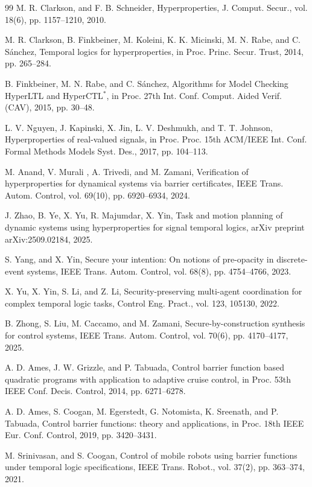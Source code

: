 \documentclass[letterpaper, 10 pt, conference]{ieeeconf}  %
\begin{document}
\begin{thebibliography}{99}
 M. R. Clarkson, and F. B. Schneider, Hyperproperties, J. Comput. Secur., vol. 18(6), pp. 1157--1210, 2010.

 M. R. Clarkson, B. Finkbeiner, M. Koleini, K. K. Micinski, M. N. Rabe, and C. Sánchez, Temporal logics for hyperproperties, in Proc. Princ. Secur. Trust, 2014, pp. 265--284.

 B. Finkbeiner, M. N. Rabe, and C. Sánchez, Algorithms for Model Checking HyperLTL and HyperCTL$^*$, in Proc. 27th Int. Conf. Comput. Aided Verif. (CAV), 2015, pp. 30--48.

 L. V. Nguyen, J. Kapinski, X. Jin, L. V. Deshmukh, and T. T. Johnson, Hyperproperties of real-valued signals, in Proc. Proc. 15th ACM/IEEE Int. Conf. Formal Methods Models Syst. Des., 2017, pp. 104--113.

 M. Anand, V. Murali , A. Trivedi, and M. Zamani, Verification of hyperproperties for dynamical systems via barrier certificates, IEEE Trans. Autom. Control, vol. 69(10), pp. 6920--6934, 2024.

 J. Zhao, B. Ye, X. Yu, R. Majumdar, X. Yin, Task and motion planning of dynamic systems using hyperproperties for signal temporal logics, arXiv preprint arXiv:2509.02184, 2025.

 S. Yang, and X. Yin, Secure your intention: On notions of pre-opacity in discrete-event systems, IEEE Trans. Autom. Control, vol. 68(8), pp. 4754--4766, 2023.

 X. Yu, X. Yin, S. Li, and Z. Li, Security-preserving multi-agent coordination for complex temporal logic tasks, Control Eng. Pract., vol. 123, 105130, 2022.

 B. Zhong, S. Liu, M. Caccamo, and M. Zamani, Secure-by-construction synthesis for control systems, IEEE Trans. Autom. Control, vol. 70(6), pp. 4170--4177, 2025.

 A. D. Ames, J. W. Grizzle, and P. Tabuada, Control barrier function based quadratic programs with application to adaptive cruise control, in Proc. 53th IEEE Conf. Decis. Control, 2014, pp. 6271--6278.

 A. D. Ames, S. Coogan, M. Egerstedt, G. Notomista, K. Sreenath, and P. Tabuada, Control barrier functions: theory and applications, in Proc. 18th IEEE Eur. Conf. Control, 2019, pp. 3420--3431.

 M. Srinivasan, and S. Coogan, Control of mobile robots using barrier functions under temporal logic specifications, IEEE Trans. Robot., vol. 37(2), pp. 363--374, 2021.


\end{thebibliography}
\end{document}
